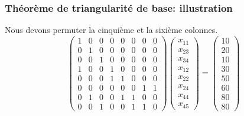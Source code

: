 \documentclass[usepdftitle=false]{beamer}
\begin{document}
\begin{frame}
\frametitle{Théorème de triangularité de base: illustration}

Nous devons permuter la cinquième et la sixième colonnes.
\[
\begin{pmatrix}
 1 & 0 & 0 & 0 & 0 & 0 & 0 & 0 \\
 0 & 1 & 0 & 0 & 0 & 0 & 0 & 0 \\
 0 & 0 & 1 & 0 & 0 & 0 & 0 & 0 \\
 1 & 0 & 0 & 1 & 0 & 0 & 0 & 0 \\
 0 & 0 & 0 & 1 & 1 & 0 & 0 & 0 \\
 0 & 0 & 0 & 0 & 0 & 0 & 1 & 1 \\
 0 & 1 & 0 & 0 & 1 & 1 & 0 & 0 \\
 0 & 0 & 1 & 0 & 0 & 1 & 1 & 0
\end{pmatrix}
\begin{pmatrix}
x_{11} \\
x_{23} \\
x_{34} \\
x_{12} \\
x_{22} \\
x_{24} \\
x_{44} \\
x_{45}
\end{pmatrix}
=
\begin{pmatrix}
10 \\
20 \\
10 \\
30 \\
50 \\
60 \\
80 \\
80
\end{pmatrix}
\]

\end{frame}
\end{document}
